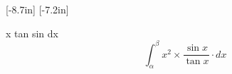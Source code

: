 \documentclass[a4paper,12pt]{book}
\begin{document}
[-8.7in]
[-7.2in]

x tan sin dx $$ \int_{\alpha}^{\beta}x^2 \times \frac{\sin x}{\tan x} \cdot dx $$
\end{document}
